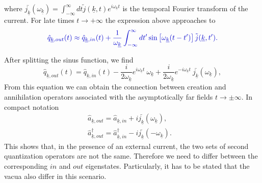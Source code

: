 \documentclass[12pt, titlepage]{article}
\begin{document}
where $ \bar{j_{\underline{k}}}(\omega_{\underline{k}})= \int^{\infty}_{-\infty}dt \tilde{j}(\underline{k},t) e^{i\omega_{\underline{k}}t} $ is the temporal Fourier transform of the current.
For late times $ t\rightarrow +\infty $ the expression above approaches to
\begin{equation}\label{q_Out_by_q_In}
 \textcolor[RGB]{0,0,204}{
\hat{q}_{\underline{k},out}(t) 
  \approx
  \hat{q}_{\underline{k},in}(t) 
  +
    \dfrac{1}{\omega_{\underline{k}}}
    \int^{\infty}_{-\infty}
    dt'
    \sin
    \left[
    \omega_{\underline{k}}(t-t') 
    \right]
     \tilde{j}(\underline{k},t')
  .}
\end{equation}

After splitting the sinus function, we find 
\begin{equation}
\hat{q}_{\underline{k},out}(t) 
  =
  \hat{q}_{\underline{k},in}(t) 
  -
  	\dfrac{i}{2\omega_{\underline{k}}}e^{i\omega_{\underline{k}}t}\
  	\omega_{\underline{k}}
  +
  	\dfrac{i}{2\omega_{\underline{k}}}e^{-i\omega_{\underline{k}}t}\
  	\bar{j_{\underline{k}}}(\omega_{\underline{k}}),
\end{equation}
From this equation we can obtain the connection between creation and annihilation operators associated with the asymptotically far fields $ t\rightarrow \pm \infty $. In compact notation
\begin{subequations}
\begin{align}
\hat{a}_{\underline{k},out}=  \hat{a}_{\underline{k},in}+i
\bar{j_{\underline{k}}}(\omega_{\underline{k}}) ,
&\\
\hat{a}^{\dagger}_{\underline{k},out} = \hat{a}^{\dagger}_{\underline{k},in}
-i
\bar{j_{\underline{k}}}(-\omega_{\underline{k}})  .
\end{align}
\end{subequations}
This shows that, in the presence of an external current, the two sets of second quantization operators are not the same. Therefore we need to differ between the corresponding $ in $ and $ out $ eigenstates. Particularly, it has to be stated that the vacua also differ in this scenario.%
\end{document}
